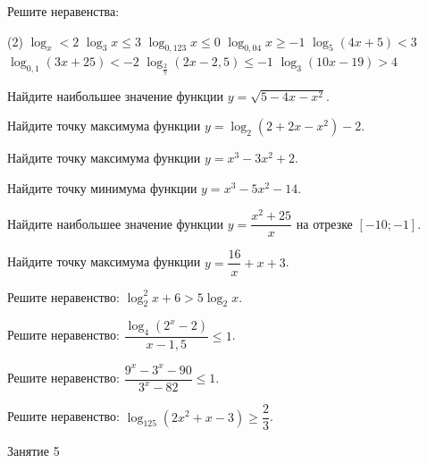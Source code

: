 \begin{class}[number=4]
	\begin{listofex}
		\item Решите неравенства: %
		\begin{tasks}(2)
			\task \( \log_x<2 \)
			\task \( \log_3x\le3 \)
			\task \( \log_{0,123}x \le 0 \)
			\task \( \log_{0,04}x \ge -1 \)
			\task \( \log_5 (4x+5) < 3 \)
			\task \( \log_{0,1}(3x+25)<-2 \)
			\task \( \log_{\tfrac{2}{7}}(2x-2,5)\le -1 \)
			\task \( \log_3 (10x-19)>4 \)
		\end{tasks}
	\end{listofex}
\end{class}

\begin{homework}[number=2]
	\begin{listofex}
		\item Найдите наибольшее значение функции \(y=\sqrt{5-4x-x^2}\).
		\item Найдите точку максимума функции \(y=\log_2 (2+2x-x^2)-2\).
		
		\item Найдите точку максимума функции \(y=x^3-3x^2+2\).
		\item Найдите точку минимума функции \(y=x^3-5x^2-14\).
		
		\item Найдите наибольшее значение функции \(y=\dfrac{ x^2+25 }{ x }\) на отрезке \(\left[ -10;-1 \right]\).
		\item Найдите точку максимума функции \(y=\dfrac{ 16 }{ x }+x+3\).
		
		\item Решите неравенство: \( \log^2_2 x + 6 > 5\log_2 x \).
		\item Решите неравенство: \( \dfrac{ \log_4(2^x-2)}{ x-1,5 } \le 1 \).
		\item Решите неравенство: \( \dfrac{ 9^x-3^x-90 }{3^x-82  } \le 1 \).
		\item Решите неравенство: \(\log_{125}(2x^2+x-3) \ge \dfrac{ 2 }{ 3 }\).
		
	\end{listofex}
\end{homework}

\begin{class}[number=5]
	\begin{listofex}
		\item Занятие 5
	\end{listofex}
\end{class}

